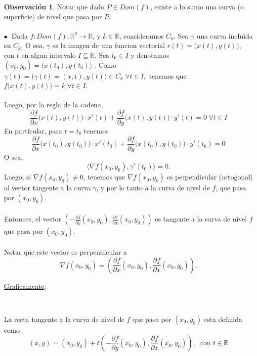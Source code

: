 \documentclass{article}
\theoremstyle{definition}
\theoremstyle{definition}
\newtheorem*{obs}{Observación}
\theoremstyle{remark}
\newcommand\bl{$\bullet\;$}
\begin{document}
\begin{obs}
  Notar que dado $P \in Dom(f)$, existe a lo sumo una curva (o superficie) de nivel que pasa por $P$. \\\\
  \textcolor{rojop2}{\bl} Dada $f: Dom(f) : \mathbb{R}^2 \to \mathbb{R}$, y $k \in \mathbb{R}$, consideramos $C_k$. Sea $\gamma$ una curva incluida en $C_k$. O sea, $\gamma$ es la imagen de una funcion vectorial $r(t)=\big(x(t),y(t))$, con $t$ en algun intervalo $I \subseteq \mathbb{R}$. Sea $t_0 \in I$ y denotamos $(x_0,y_0)=\big(x(t_0),y(t_0)\big)$
    . Como $\gamma(t)=\big(\gamma(t)=(x,t),y(t)\big) \in C_k \; \forall t \in I,$ tenemos que $f\big(x(t),y(t)\big)=k \; \forall t \in I$.\\\\Luego, por la regla de la cadena, \[
      \frac{\partial f}{\partial x}\big(x(t),y(t)\big) \cdot x'(t) + \frac{\partial f}{\partial y} \big(x(t),y(t)\big) \cdot y'(t) = 0\; \forall t \in I 
    \]
    En particular, para $t=t_0$ tenemos \[
      \frac{\partial f}{\partial x}\big(x(t_0),y(t_0)\big) \cdot x'(t_0) + \frac{\partial f}{\partial y} \big(x(t_0),y(t_0)\big) \cdot y'(t_0) = 0 
    \]
    O sea, \[
\big\langle \nabla f(x_0,y_0),\gamma'(t_0) \big\rangle =0.
\]Luego, si $\nabla f(x_0,y_0)\neq0$, tenemos que $\nabla f(x_0,y_0)$ es perpendicular (ortogonal) al vector tangente a la curva $\gamma$, y por lo tanto a la curva de nivel de $f$, que pasa por $(x_0,y_0)$.\\\\ Entonces, el vector $\left(-\frac{\partial f}{\partial y}(x_0,y_0),\frac{\partial f}{\partial x}(x_0,y_0)\right)$ es tangente a la curva de nivel $f$ que pasa por $(x_0,y_0)$. \\\\ Notar que este vector es perpendicular a $$ \nabla f(x_0,y_0)=\left(\frac{\partial f}{\partial x}(x_0,y_0),\frac{\partial f}{\partial x}(x_0,y_0)\right).$$
  \end{obs}\pagebreak
  \underline{Graficamente}:
  \begin{figure}[h]
\centering
\def\svgwidth{0.75\textwidth}
\makebox[\textwidth]{
}
\end{figure} \\ \pagebreak
\begin{defi}
  La recta tangente a la curva de nivel de $f$ que pasa por $(x_0,y_0)$ esta definida como \[
    (x,y)=(x_0,y_0)+t\left(-\frac{\partial f}{\partial y}(x_0,y_0),\frac{\partial f}{\partial x}(x_0,y_0)\right),\;\text{ con } t \in \mathbb{R}
  \]
\end{defi}
\end{document}
